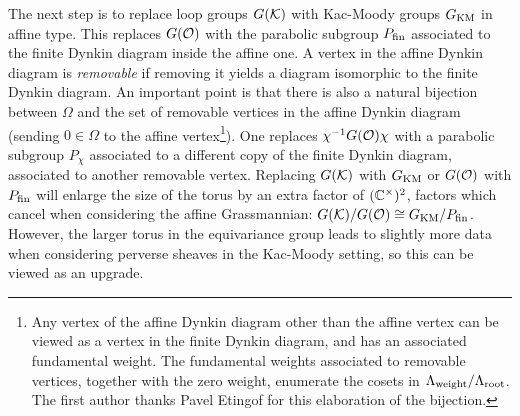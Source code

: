 {The next step is to replace loop groups $G(\mathcal{K})$ with Kac-Moody groups $G_{\operatorname{KM}}$ in affine type. This replaces $G(\mathcal{O})$ with the parabolic subgroup $P_{\operatorname{fin}}$ associated to the finite Dynkin diagram inside the affine one. A vertex in the affine Dynkin diagram is \emph{removable} if removing it yields a diagram isomorphic to the finite Dynkin diagram. An important point is that there is also a natural bijection between $\Omega$ and the set of removable vertices in the affine Dynkin diagram  (sending $0 \in \Omega$ to the affine vertex\footnote{Any vertex of the affine Dynkin diagram other than the affine vertex can be viewed as a vertex in the finite Dynkin diagram, and has an associated fundamental weight. The fundamental weights associated to removable vertices, together with the zero weight, enumerate the cosets in $\Lambda_{\operatorname{weight}}/\Lambda_{\operatorname{root}}$. The first author thanks Pavel Etingof for this elaboration of the bijection.}). One replaces $\chi^{-1} G(\mathcal{O}) \chi$ with a parabolic subgroup $P_{\chi}$ associated to a different copy of the finite Dynkin diagram, associated to another removable vertex. Replacing $G(\mathcal{K})$ with $G_{\operatorname{KM}}$ or $G(\mathcal{O})$ with $P_{\operatorname{fin}}$ will enlarge the size of the torus by an extra factor of $(\mathbb{C}^{\times})^2$, factors which cancel when considering the affine Grassmannian:  $G(\mathcal{K}) / G(\mathcal{O}) \cong G_{\operatorname{KM}}/P_{\operatorname{fin}}$. However, the larger torus in the equivariance group leads to slightly more data when considering perverse sheaves in the Kac-Moody setting, so this can be viewed as an upgrade. 

}
